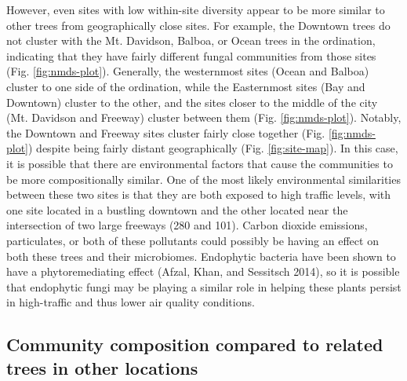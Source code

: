 \documentclass[fleqn,10pt,lineno]{wlpeerj} %
\begin{document}
However, even sites with low within-site diversity appear to be more similar to other trees from geographically close sites. For example, the Downtown trees do not cluster with the Mt. Davidson, Balboa, or Ocean trees in the ordination, indicating that they have fairly different fungal communities from those sites (Fig. \ref{fig:nmds-plot}). Generally, the westernmost sites (Ocean and Balboa) cluster to one side of the ordination, while the Easternmost sites (Bay and Downtown) cluster to the other, and the sites closer to the middle of the city (Mt. Davidson and Freeway) cluster between them (Fig. \ref{fig:nmds-plot}). Notably, the Downtown and Freeway sites cluster fairly close together (Fig. \ref{fig:nmds-plot}) despite being fairly distant geographically (Fig. \ref{fig:site-map}). In this case, it is possible that there are environmental factors that cause the communities to be more compositionally similar. One of the most likely environmental similarities between these two sites is that they are both exposed to high traffic levels, with one site located in a bustling downtown and the other located near the intersection of two large freeways (280 and 101). Carbon dioxide emissions, particulates, or both of these pollutants could possibly be having an effect on both these trees and their microbiomes. Endophytic bacteria have been shown to have a phytoremediating effect (Afzal, Khan, and Sessitsch 2014), so it is possible that endophytic fungi may be playing a similar role in helping these plants persist in high-traffic and thus lower air quality conditions.

\hypertarget{community-composition-compared-to-related-trees-in-other-locations}{%
\subsection*{Community composition compared to related trees in other locations}\label{community-composition-compared-to-related-trees-in-other-locations}}
\end{document}
